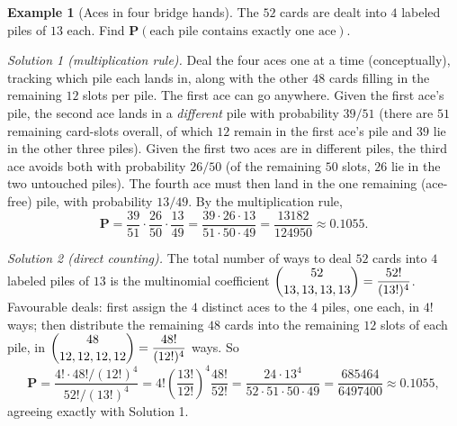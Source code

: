 \documentclass[11pt]{article}
\theoremstyle{definition}
\newtheorem{example}[definition]{Example}
\theoremstyle{plain}
\theoremstyle{remark}
\begin{document}
\begin{example}[Aces in four bridge hands]
The $52$ cards are dealt into $4$ labeled piles of $13$ each. Find $\mathbf{P}(\text{each pile
contains exactly one ace})$.

\emph{Solution 1 (multiplication rule).} Deal the four aces one at a time (conceptually), tracking
which pile each lands in, along with the other $48$ cards filling in the remaining $12$ slots per
pile. The first ace can go anywhere. Given the first ace's pile, the second ace lands in a
\emph{different} pile with probability $39/51$ (there are $51$ remaining card-slots overall, of
which $12$ remain in the first ace's pile and $39$ lie in the other three piles). Given the first
two aces are in different piles, the third ace avoids both with probability $26/50$ (of the
remaining $50$ slots, $26$ lie in the two untouched piles). The fourth ace must then land in the
one remaining (ace-free) pile, with probability $13/49$. By the multiplication rule,
\[
\mathbf{P} = \frac{39}{51}\cdot\frac{26}{50}\cdot\frac{13}{49}
= \frac{39\cdot26\cdot13}{51\cdot50\cdot49} = \frac{13182}{124950} \approx \boxed{0.1055}.
\]

\emph{Solution 2 (direct counting).} The total number of ways to deal $52$ cards into $4$ labeled
piles of $13$ is the multinomial coefficient $\dbinom{52}{13,13,13,13} = \dfrac{52!}{(13!)^4}$.
Favourable deals: first assign the $4$ distinct aces to the $4$ piles, one each, in $4!$ ways; then
distribute the remaining $48$ cards into the remaining $12$ slots of each pile, in
$\dbinom{48}{12,12,12,12}=\dfrac{48!}{(12!)^4}$ ways. So
\[
\mathbf{P} = \frac{4!\cdot 48!/(12!)^4}{52!/(13!)^4}
= 4!\left(\frac{13!}{12!}\right)^{\!4}\frac{48!}{52!}
= \frac{24\cdot 13^4}{52\cdot51\cdot50\cdot49} = \frac{685464}{6497400}\approx 0.1055,
\]
agreeing exactly with Solution 1.
\end{example}
\end{document}
